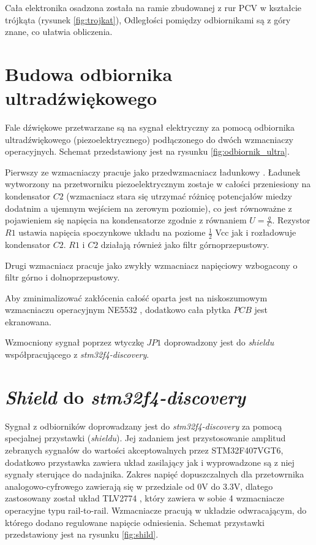 Cała elektronika osadzona została na ramie zbudowanej z rur PCV w kształcie trójkąta (rysunek \ref{fig:trojkat}), 
Odległości pomiędzy odbiornikami są z góry znane, co ułatwia obliczenia.




\clearpage
\section{Budowa odbiornika ultradźwiękowego}

Fale dźwiękowe przetwarzane są na sygnał elektryczny za pomocą odbiornika ultradźwiękowego (piezoelektrycznego) 
podłączonego do dwóch wzmacniaczy operacyjnych. Schemat przedstawiony jest na rysunku \ref{fig:odbiornik_ultra}.


Pierwszy ze wzmacniaczy pracuje jako przedwzmacniacz ładunkowy \cite{bib:wzm_ladunkowy}.
Ładunek wytworzony na przetworniku piezoelektrycznym zostaje w całości przeniesiony na kondensator $C2$ 
(wzmacniacz stara się utrzymać różnicę potencjałów miedzy dodatnim a ujemnym wejściem na zerowym poziomie),
co jest równoważne z pojawieniem się napięcia na kondensatorze zgodnie z równaniem $U=\frac{q}{C}$.
Rezystor $R1$ ustawia napięcia spoczynkowe układu na poziome $\frac{1}{2}$ Vcc jak i rozładowuje kondensator $C2$.
$R1$ i $C2$ działają również jako filtr górnoprzepustowy.

Drugi wzmacniacz pracuje jako zwykły wzmacniacz napięciowy wzbogacony o filtr górno i dolnoprzepustowy.

Aby zminimalizować zakłócenia całość oparta jest na niskoszumowym wzmacniaczu operacyjnym NE5532 \cite{bib:ne5532}, 
dodatkowo cała płytka $PCB$ jest ekranowana.

Wzmocniony sygnał poprzez wtyczkę $JP1$ doprowadzony jest do \textit{shieldu} współpracującego z \textit{stm32f4-discovery}.

\clearpage

\section{\textit{Shield} do \textit{stm32f4-discovery}}

Sygnał z odbiorników doprowadzany jest do \textit{stm32f4-discovery} za pomocą specjalnej przystawki (\textit{shieldu}).
Jej zadaniem jest przystosowanie amplitud zebranych sygnałów do wartości akceptowalnych przez STM32F407VGT6,
dodatkowo przystawka zawiera układ zasilający jak i wyprowadzone są z niej sygnały sterujące do nadajnika.
Zakres napięć dopuszczalnych dla przetowrnika analogowo-cyfrowego zawierają się w przedziale od 0V do 3.3V,
dlatego zastosowany został układ TLV2774 \cite{bib:TLV2774}, który zawiera w sobie 4 wzmacniacze operacyjne typu
rail-to-rail. Wzmacniacze pracują w układzie odwracającym, do którego dodano regulowane napięcie odniesienia.
Schemat przystawki przedstawiony jest na rysunku \ref{fig:shild}.





